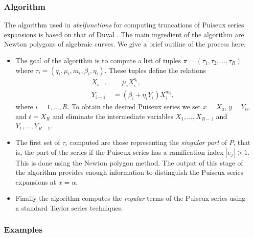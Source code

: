 \subsubsection*{Algorithm}

The algorithm used in {\it abelfunctions} for computing truncations of Puiseux
series expansions is based on that of Duval \cite{Duval89}. The main ingredient
of the algorithm are Newton polygons of algebraic curves. We give a brief
outline of the process here.
\begin{itemize}
\item The goal of the algorithm is to compute a list of tuples $\pi = (\tau_1,
  \tau_2, \ldots, \tau_R)$ where $\tau_i = (q_i,\mu_i,m_i,\beta_i,\eta_i)$.
  These tuples define the relations
  \begin{align*}
    X_{i-1} &= \mu_i X_i^{q_i}, \\
    Y_{i-1} &= (\beta_i + \eta_iY_i)X_i^{m_i},
  \end{align*}
  where $i = 1, \ldots, R$. To obtain the desired Puiseux series we set $x =
  X_0$, $y = Y_0$, and $t = X_R$ and eliminate the intermediate variables
  $X_1,\ldots,X_{R-1}$ and $Y_1,\ldots,Y_{R-1}$.
\item The first set of $\tau_i$ computed are those representing the {\it
    singular part} of $P$, that is, the part of the series if the Puiseux series
  has a ramification index $|e_j|>1$. This is done using the Newton polygon
  method. The output of this stage of the algorithm provides enough information
  to distinguish the Puiseux series expansions at $x=\alpha$.
\item Finally the algorithm computes the {\it regular} terms of the Puiseux
  series using a standard Taylor series techniques.
\end{itemize}

\subsubsection*{Examples}

